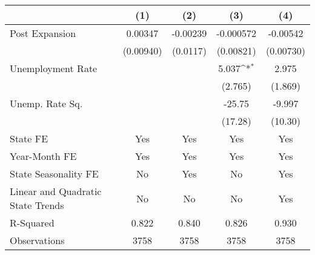 {
\def\sym#1{\ifmmode^{#1}\else\(^{#1}\)\fi}
\begin{tabular}{l*{4}{c}}
\hline\hline
                    &\multicolumn{1}{c}{(1)}         &\multicolumn{1}{c}{(2)}         &\multicolumn{1}{c}{(3)}         &\multicolumn{1}{c}{(4)}         \\
\hline
Post Expansion      &     0.00347         &    -0.00239         &   -0.000572         &    -0.00542         \\
                    &   (0.00940)         &    (0.0117)         &   (0.00821)         &   (0.00730)         \\
[1em]
Unemployment Rate   &                     &                     &       5.037\sym{*}  &       2.975         \\
                    &                     &                     &     (2.765)         &     (1.869)         \\
[1em]
Unemp. Rate Sq.     &                     &                     &      -25.75         &      -9.997         \\
                    &                     &                     &     (17.28)         &     (10.30)         \\
\hline
State FE            &         Yes         &         Yes         &         Yes         &         Yes         \\
Year-Month FE       &         Yes         &         Yes         &         Yes         &         Yes         \\
State Seasonality FE&          No         &         Yes         &          No         &         Yes         \\
Linear and Quadratic State Trends&          No         &          No         &          No         &         Yes         \\
R-Squared           &       0.822         &       0.840         &       0.826         &       0.930         \\
Observations        &        3758         &        3758         &        3758         &        3758         \\
\hline\hline
\end{tabular}
}
